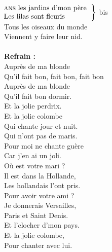 
\\ 
$\left.\begin{tabular}{l}
\hspace{-0.4cm}
\textsc{ans} les jardins d'mon père 
\\
\hspace{-0.4cm}
Les lilas sont fleuris
\end{tabular}\right\rbrace$ bis
\\Tous les oiseaux du monde 
\\Viennent y faire leur nid.
\\\\\textbf{Refrain :}
\\Auprès de ma blonde 
\\Qu'il fait bon, fait bon, fait bon 
\\Auprès de ma blonde 
\\Qu'il fait bon dormir.
\\
{Et la jolie perdrix.}
\\Et la jolie  colombe 
\\Qui chante jour et nuit. 
\\
{Qui n'ont pas de maris.}
\\Pour moi ne chante guère 
\\Car j'en ai un joli. 
\\
{Où est votre mari ?}
\\Il est dans la Hollande, 
\\Les hollandais l'ont pris. 
\\
{Pour avoir votre ami ?}
\\Je donnerais Versailles,  
\\Paris et Saint Denis. 
\\
{Et l'clocher d'mon pays.}
\\Et la jolie colombe,
\\Pour chanter avec lui.
\\

\breakpage


